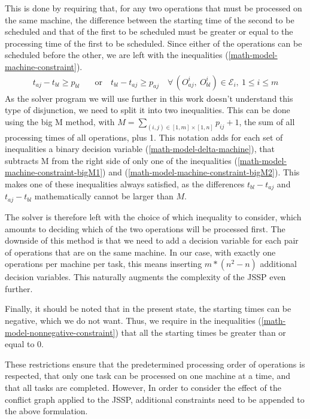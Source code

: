 \documentclass{mimosis}
\begin{document}
This is done by requiring that, for any two operations that must be processed on the same machine, the difference between the starting time of the second to be scheduled and that of the first to be scheduled must be greater or equal to the processing time of the first to be scheduled. Since either of the operations can be scheduled before the other, we are left with the inequalities (\ref{math-model-machine-constraint}).
\begin{align} 
\label{math-model-machine-constraint}
t_{aj} - t_{bl} \geq p_{bl} \quad &\text{or} \quad t_{bl} - t_{aj} \geq p_{aj} \quad \forall \, (O_{aj}^{i},\ O_{bl}^{i}) \in \mathcal{E}_i,\ 1 \leq i \leq m
\end{align} 
As the solver program we will use further in this work doesn't understand this type of disjunction, we need to split it into two inequalities. This can be done using the big M method, with \(M = \sum_{(i,j) \in [1, m] \times [1, n]} p_{ij} + 1\), the sum of all processing times of all operations, plus 1. This notation adds for each set of inequalities a binary decision variable (\ref{math-model-delta-machine}), that subtracts M from the right side of only one of the inequalities (\ref{math-model-machine-constraint-bigM1}) and (\ref{math-model-machine-constraint-bigM2}). This makes one of these inequalities always satisfied, as the differences \(t_{bl} - t_{aj}\) and \(t_{aj} - t_{bl}\) mathematically cannot be larger than \(M\).

The solver is therefore left with the choice of which inequality to consider, which amounts to deciding which of the two operations will be processed first. The downside of this method is that we need to add a decision variable for each pair of operations that are on the same machine. In our case, with exactly one operations per machine per task, this means inserting \(m * (n^2 - n)\) additional decision variables. This naturally augments the complexity of the JSSP even further.

Finally, it should be noted that in the present state, the starting times can be negative, which we do not want. Thus, we require in the inequalities (\ref{math-model-nonnegative-constraint}) that all the starting times be greater than or equal to 0.

These restrictions ensure that the predetermined processing order of operations is respected, that only one task can be processed on one machine at a time, and that all tasks are completed. However, In order to consider the effect of the conflict graph applied to the JSSP, additional constraints need to be appended to the above formulation. 
\end{document}

